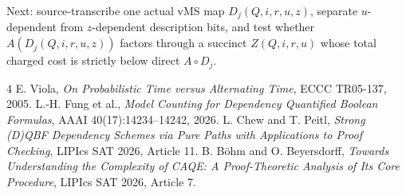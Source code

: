 \documentclass[11pt]{article}
\begin{document}
Next: source-transcribe one actual vMS map \(D_j(Q,i,r,u,z)\), separate \(u\)-dependent from \(z\)-dependent description bits, and test whether \(A(D_j(Q,i,r,u,z))\) factors through a succinct \(Z(Q,i,r,u)\) whose total charged cost is strictly below direct \(A\circ D_j\).

\begin{thebibliography}{4}
 E. Viola, \emph{On Probabilistic Time versus Alternating Time}, ECCC TR05-137, 2005.
 L.-H. Fung et al., \emph{Model Counting for Dependency Quantified Boolean Formulas}, AAAI 40(17):14234--14242, 2026.
 L. Chew and T. Peitl, \emph{Strong (D)QBF Dependency Schemes via Pure Paths with Applications to Proof Checking}, LIPIcs SAT 2026, Article 11.
 B. B\"ohm and O. Beyersdorff, \emph{Towards Understanding the Complexity of CAQE: A Proof-Theoretic Analysis of Its Core Procedure}, LIPIcs SAT 2026, Article 7.
\end{thebibliography}
\end{document}
